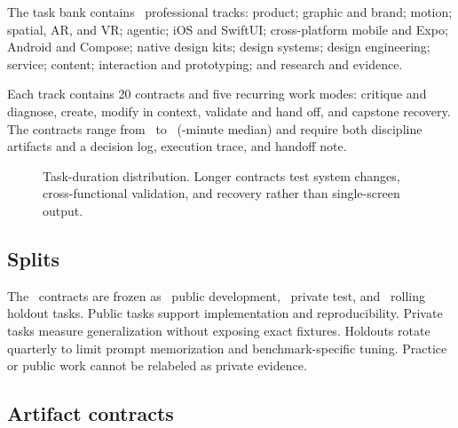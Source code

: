 \documentclass[10pt,twocolumn]{article}
\begin{document}
The task bank contains \BenchmarkTracks\ professional tracks:
product; graphic and brand; motion; spatial, AR, and VR; agentic; iOS and
SwiftUI; cross-platform mobile and Expo; Android and Compose; native design
kits; design systems; design engineering; service; content; interaction and
prototyping; and research and evidence.

Each track contains 20 contracts and five recurring work modes: critique and
diagnose, create, modify in context, validate and hand off, and capstone
recovery. The contracts range from \MinTaskMinutes\ to \MaxTaskMinutes\
(\MedianTaskMinutes-minute median) and require both discipline artifacts and a
decision log, execution trace, and handoff note.

\begin{figure}[t]
\centering
{}
\caption{Task-duration distribution. Longer contracts test system changes,
cross-functional validation, and recovery rather than single-screen output.}
\label{fig:durations}
\end{figure}

\subsection{Splits}

The \BenchmarkTasks\ contracts are frozen as \PublicTasks\ public development,
\PrivateTasks\ private test, and \HoldoutTasks\ rolling holdout tasks. Public
tasks support implementation and reproducibility. Private tasks measure
generalization without exposing exact fixtures. Holdouts rotate quarterly to
limit prompt memorization and benchmark-specific tuning. Practice or public
work cannot be relabeled as private evidence.

\subsection{Artifact contracts}
\end{document}
